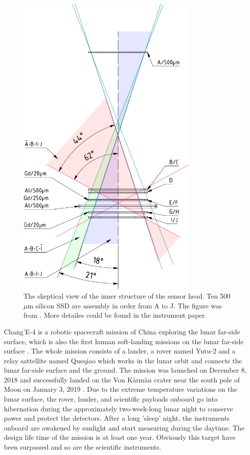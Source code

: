 \begin{figure}
    \centering
    \includegraphics[width = 0.8\textwidth]{images/change4_lnd-c9_trigger-cones-colored.pdf}
    \caption{The skeptical view of the inner structure of the sensor head. Ten 500 $\mu$m silicon \acs{SSD} are assembly in order from A to J. The figure was from \cite{Wimmer-2020-LND}. More detailes could be found in the instrument paper.}
\end{figure}
Chang'E-4 is a robotic spacecraft mission of China exploring the lunar far-side surface, which is also the first human soft-landing missions on the lunar far-side surface \cite{Li2021SSRv}. The whole mission consists of a lander, a rover named Yutu-2 and a relay sattellite named Queqiao which works in the lunar orbit and connects the lunar far-side surface and the ground. The mission was launched on December 8, 2018 and successfully landed on the Von K\`arm\`an crater near the south pole of Moon on January 3, 2019 \cite{Wu2019NatGe}. Due to the extreme temperature variations on the lunar surface, the rover, lander, and scientific payloads onboard go into hibernation during the approximately two-week-long lunar night to conserve power and protect the detectors.  After a long 'sleep' night, the instruments onboard are awakened by sunlight and start measuring during the daytime. The design life time of the mission is at least one year. Obviously this target have been surpassed and so are the scientific instruments.

